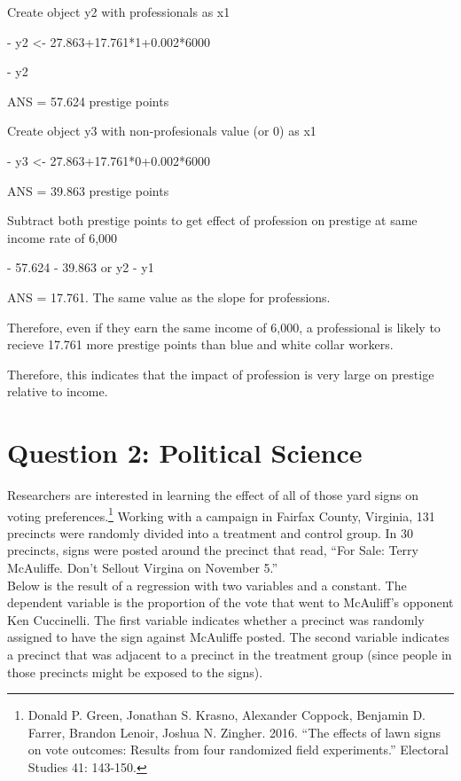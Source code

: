 \documentclass[12pt,letterpaper]{article}
\begin{document}
\begin{enumerate}
Create object y2 with professionals as x1

- y2 <- 27.863+17.761*1+0.002*6000

-	y2  

ANS = 57.624 prestige points 

Create object y3 with non-profesionals value (or 0) as x1

- y3 <- 27.863+17.761*0+0.002*6000 

ANS = 39.863 prestige points

Subtract both prestige points to get effect of profession on prestige at same income rate of 6,000

-	57.624 - 39.863 or y2 - y1

ANS = 17.761. The same value as the slope for professions.

Therefore, even if they earn the same income of 6,000, a professional is likely to recieve 17.761 more prestige points than blue and white collar workers. 

Therefore, this indicates that the impact of profession is very large on prestige relative to income. 
	
	
\end{enumerate}

\newpage

\section*{Question 2: Political Science}
\vspace{.25cm}
\noindent 	Researchers are interested in learning the effect of all of those yard signs on voting preferences.\footnote{Donald P. Green, Jonathan	S. Krasno, Alexander Coppock, Benjamin D. Farrer,	Brandon Lenoir, Joshua N. Zingher. 2016. ``The effects of lawn signs on vote outcomes: Results from four randomized field experiments.'' Electoral Studies 41: 143-150. } Working with a campaign in Fairfax County, Virginia, 131 precincts were randomly divided into a treatment and control group. In 30 precincts, signs were posted around the precinct that read, ``For Sale: Terry McAuliffe. Don't Sellout Virgina on November 5.'' \\

Below is the result of a regression with two variables and a constant.  The dependent variable is the proportion of the vote that went to McAuliff's opponent Ken Cuccinelli. The first variable indicates whether a precinct was randomly assigned to have the sign against McAuliffe posted. The second variable indicates
a precinct that was adjacent to a precinct in the treatment group (since people in those precincts might be exposed to the signs).  \\
\end{document}
